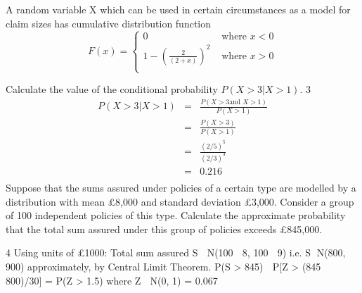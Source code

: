 \documentclass[a4paper,12pt]{article}
\begin{document}
 A random variable X which can be used in certain circumstances as a model for claim
sizes has cumulative distribution function
\[F(x) = \begin{cases}
0 & \mbox{ where }  x < 0 \\ 
1 - \left(\frac{2}{(2+x)}\right)^2 & \mbox{ where }  x > 0 \\ 
\end{cases}
\]

Calculate the value of the conditional probability $P(X > 3|X > 1)$. 
3 
\begin{eqnarray*}
P(X > 3| X > 1) &=& \frac{P(X > 3 \mbox{and }X > 1)}{P(X > 1)}\\
&=& \frac{P(X > 3 )}{P(X > 1)}\\
&=& \frac{(2/5)^5 }{(2/3)^3 }\\
&=& 0.216\\
\end{eqnarray*}
\newpage 
Suppose that the sums assured under policies of a certain type are modelled by a
distribution with mean £8,000 and standard deviation £3,000. Consider a group of
100 independent policies of this type.
Calculate the approximate probability that the total sum assured under this group of
policies exceeds £845,000.


4 Using units of £1000:
Total sum assured S  N(100  8, 100  9) i.e. S  N(800, 900) approximately, by
Central Limit Theorem.
P(S > 845)  P[Z > (845  800)/30] = P(Z > 1.5) where Z  N(0, 1)
= 0.067
\end{document}
